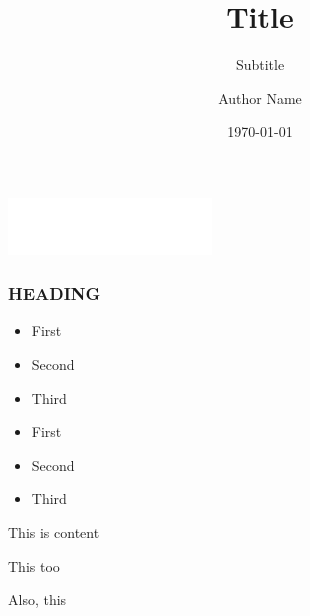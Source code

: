 \documentclass[aspectratio=169]{beamer}
\title{Title}
\subtitle{Subtitle}
\date{\today}
\author{Author Name}
\institute{}
\begin{document}
    
    \begin{frame}[plain]
    \maketitle
    \vspace*{-1.5cm}
    \hspace*{9cm}
    \includegraphics[height=1.5cm]{images/logo.png}
    \end{frame}

  \begin{frame}[plain]
    \frametitle{HEADING}

    \begin{itemize}
      \item First
      \item Second
      \item Third
      \item First
      \item Second
      \item Third
      
    \end{itemize}
  \end{frame}


  \begin{frame}
    \Large
    
    This is content\par
    This too\par
    Also, this
    
    \end{frame}
    
    \begin{frame}[plain]
\end{frame}
\end{document}
